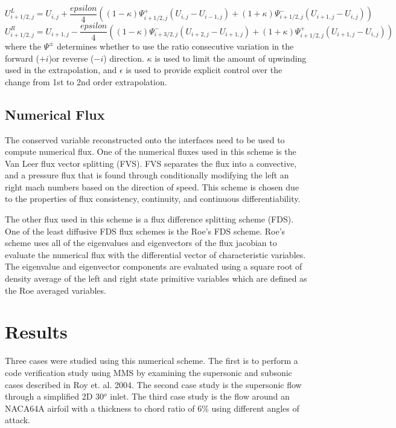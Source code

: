 \documentclass[]{aiaa-tc}%
\begin{document}
\begin{equation}\label{eqn:MUSCLleft}
  U_{i+1/2, j}^L = U_{i,j} +\frac{epsilon}{4}\left((1-\kappa)\Psi_{i+1/2,j}^+(U_{i,j} - U_{i-1, j})+ (1+\kappa)\Psi_{i+1/2,j}^-(U_{i+1,j} - U_{i, j})\right)
\end{equation}
\begin{equation}\label{eqn:MUSCLright}
  U_{i+1/2, j}^R = U_{i+1, j} - \frac{epsilon}{4}\left((1-\kappa)\Psi_{i+3/2,j}^-(U_{i+2,j} - U_{i+1, j})+ (1+\kappa)\Psi_{i+1/2,j}^+(U_{i+1,j} - U_{i, j})\right)
\end{equation}
where the $\Psi^{\pm}$ determines whether to use the ratio consecutive variation in the forward ($+i$)or reverse ($-i$) direction. $\kappa$ is used to limit the amount of upwinding used in the extrapolation, and $\epsilon$ is used to provide explicit control over the change from 1st to 2nd order extrapolation.

\subsection{Numerical Flux}
The conserved variable reconstructed onto the interfaces need to be used to compute numerical flux. One of the numerical fluxes used in this scheme is the Van Leer flux vector splitting (FVS). FVS separates the flux into a convective, and a pressure flux that is found through conditionally modifying the left an right mach numbers based on the direction of speed. This scheme is chosen due to the properties of flux consistency, continuity, and continuous differentiability. 

The other flux used in this scheme is a flux difference splitting scheme (FDS). One of the least diffusive FDS flux schemes is the Roe's FDS scheme. Roe's scheme uses all of the eigenvalues and eigenvectors of the flux jacobian to evaluate the numerical flux with the differential vector of characteristic variables. The eigenvalue and eigenvector components are evaluated using a square root of density average of the left and right state primitive variables which are defined as the Roe averaged variables.

\section{Results}
Three cases were studied using this numerical scheme. The first is to perform a code verification study using MMS by examining the supersonic and subsonic cases described in Roy et. al. 2004.\cite{Roy2004} The second case study is the supersonic flow through a simplified 2D 30$^o$ inlet. The third case study is the flow around an NACA64A airfoil with a thickness to chord ratio of $6$\% using different angles of attack. 
\end{document}
